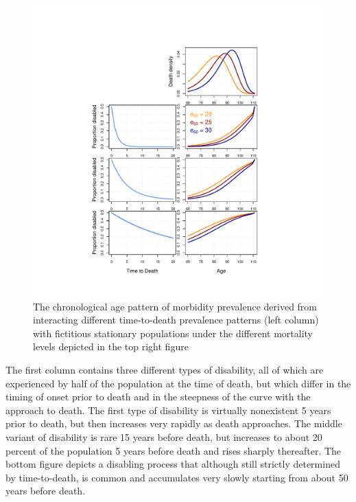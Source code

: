 \documentclass[11pt,oneside,a4paper]{article} %
\begin{document}
\begin{figure}
\begin{adjustwidth}{-1.5cm}{}
	\centering
	\includegraphics[scale=.8]{Figures/schematic3.pdf}
	\caption{The chronological age pattern of morbidity prevalence derived from interacting different time-to-death prevalence patterns (left column) with fictitious stationary populations under the different mortality levels depicted in the top right figure}
	\label{fig:Fig_schematic3}
\end{adjustwidth}
\end{figure}

The first column contains three different types of disability, all of which are
experienced by half of the population at the time of death, but which differ in
the timing of onset prior to death and in the steepness of the curve with the
approach to death.
The first type of disability is virtually nonexistent 5 years prior to death, but then increases very rapidly as death approaches. The middle variant of disability is rare 15 years before death, but increases to about 20 percent of the population 5 years before death and rises sharply thereafter. The bottom figure depicts a disabling process that although still strictly determined by time-to-death, is common and accumulates very slowly starting from about 50 years before death.
\end{document}
